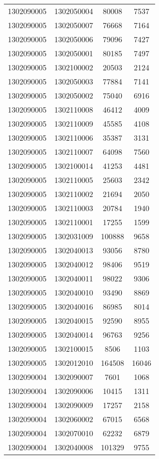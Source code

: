 \begin{longtable}[h]{llcc}
		1302090005 & 1302050004 & 80008 & 7537\\
		1302090005 & 1302050007 & 76668 & 7164\\
		1302090005 & 1302050006 & 79096 & 7427\\
		1302090005 & 1302050001 & 80185 & 7497\\
		1302090005 & 1302100002 & 20503 & 2124\\
		1302090005 & 1302050003 & 77884 & 7141\\
		1302090005 & 1302050002 & 75040 & 6916\\
		1302090005 & 1302110008 & 46412 & 4009\\
		1302090005 & 1302110009 & 45585 & 4108\\
		1302090005 & 1302110006 & 35387 & 3131\\
		1302090005 & 1302110007 & 64098 & 7560\\
		1302090005 & 1302100014 & 41253 & 4481\\
		1302090005 & 1302110005 & 25603 & 2342\\
		1302090005 & 1302110002 & 21694 & 2050\\
		1302090005 & 1302110003 & 20784 & 1940\\
		1302090005 & 1302110001 & 17255 & 1599\\
		1302090005 & 1302031009 & 100888 & 9658\\
		1302090005 & 1302040013 & 93056 & 8780\\
		1302090005 & 1302040012 & 98406 & 9519\\
		1302090005 & 1302040011 & 98022 & 9306\\
		1302090005 & 1302040010 & 93490 & 8869\\
		1302090005 & 1302040016 & 86985 & 8014\\
		1302090005 & 1302040015 & 92590 & 8955\\
		1302090005 & 1302040014 & 96763 & 9256\\
		1302090005 & 1302100015 & 8506 & 1103\\
		1302090005 & 1302012010 & 164508 & 16046\\
		1302090004 & 1302090007 & 7601 & 1068\\
		1302090004 & 1302090006 & 10415 & 1311\\
		1302090004 & 1302090009 & 17257 & 2158\\
		1302090004 & 1302060002 & 67015 & 6568\\
		1302090004 & 1302070010 & 62232 & 6879\\
		1302090004 & 1302040008 & 101329 & 9755\\

\end{longtable}
